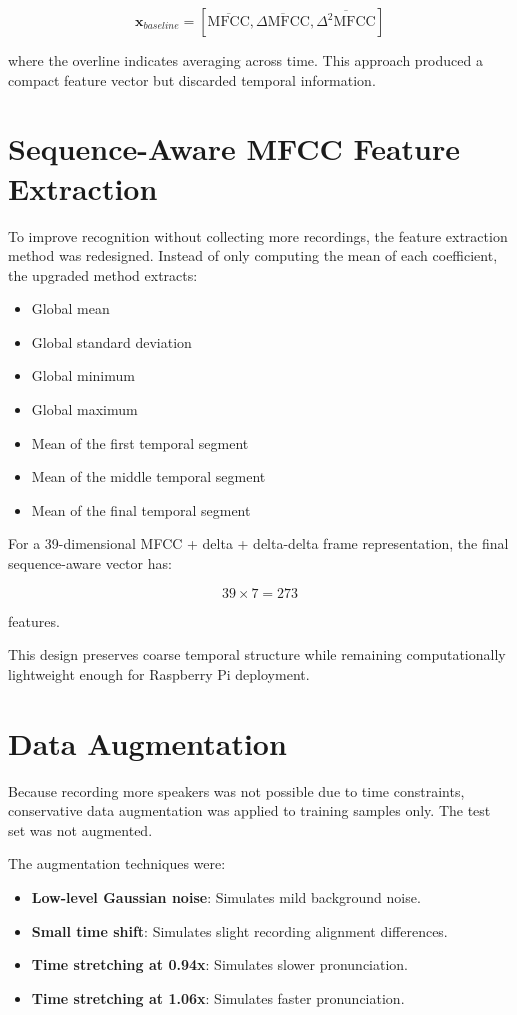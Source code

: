 \documentclass[12pt,a4paper]{report}
\begin{document}
\[
\mathbf{x}_{baseline} =
\left[
\overline{\text{MFCC}},
\overline{\Delta \text{MFCC}},
\overline{\Delta^2 \text{MFCC}}
\right]
\]

where the overline indicates averaging across time. This approach produced a compact feature vector but discarded temporal information.

\section{Sequence-Aware MFCC Feature Extraction}
To improve recognition without collecting more recordings, the feature extraction method was redesigned. Instead of only computing the mean of each coefficient, the upgraded method extracts:

\begin{itemize}
    \item Global mean
    \item Global standard deviation
    \item Global minimum
    \item Global maximum
    \item Mean of the first temporal segment
    \item Mean of the middle temporal segment
    \item Mean of the final temporal segment
\end{itemize}

For a 39-dimensional MFCC + delta + delta-delta frame representation, the final sequence-aware vector has:

\[
39 \times 7 = 273
\]

features.

This design preserves coarse temporal structure while remaining computationally lightweight enough for Raspberry Pi deployment.

\section{Data Augmentation}
Because recording more speakers was not possible due to time constraints, conservative data augmentation was applied to training samples only. The test set was not augmented.

The augmentation techniques were:

\begin{itemize}
    \item \textbf{Low-level Gaussian noise}: Simulates mild background noise.
    \item \textbf{Small time shift}: Simulates slight recording alignment differences.
    \item \textbf{Time stretching at 0.94x}: Simulates slower pronunciation.
    \item \textbf{Time stretching at 1.06x}: Simulates faster pronunciation.
\end{itemize}
\end{document}

